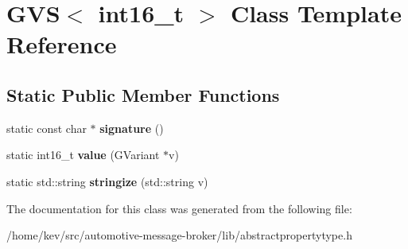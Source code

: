\hypertarget{classGVS_3_01int16__t_01_4}{\section{G\-V\-S$<$ int16\-\_\-t $>$ Class Template Reference}
\label{classGVS_3_01int16__t_01_4}
}
\subsection*{Static Public Member Functions}
\begin{DoxyCompactItemize}
\item 
\hypertarget{classGVS_3_01int16__t_01_4_a74fd2e54cfeebf2f87376b11a4d7b527}{static const char $\ast$ {\bfseries signature} ()}\label{classGVS_3_01int16__t_01_4_a74fd2e54cfeebf2f87376b11a4d7b527}

\item 
\hypertarget{classGVS_3_01int16__t_01_4_a3b5ee21a1f741c1543bf22738885e460}{static int16\-\_\-t {\bfseries value} (G\-Variant $\ast$v)}\label{classGVS_3_01int16__t_01_4_a3b5ee21a1f741c1543bf22738885e460}

\item 
\hypertarget{classGVS_3_01int16__t_01_4_a8ebde11ede44782a48dc2aecbbb5e3af}{static std\-::string {\bfseries stringize} (std\-::string v)}\label{classGVS_3_01int16__t_01_4_a8ebde11ede44782a48dc2aecbbb5e3af}

\end{DoxyCompactItemize}


The documentation for this class was generated from the following file\-:\begin{DoxyCompactItemize}
\item 
/home/kev/src/automotive-\/message-\/broker/lib/abstractpropertytype.\-h\end{DoxyCompactItemize}
